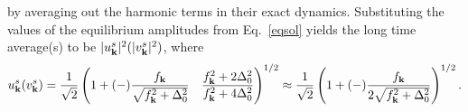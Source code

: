 \documentclass[aps,pra,floats,epsfig,pdflatex]{revtex4}                                                              %
\begin{document}
 {by averaging out the harmonic terms in their exact dynamics.} 
 {Substituting the values of the equilibrium amplitudes from Eq.}~\ref{eqsol}  {yields the long time average(s) to be $|u^s_{\bf k}|^2 (|v^s_{\bf k}|^2)$, where}
\begin{equation}
u^s_{\bf k} (v^s_{\bf k})=\frac{1}{\sqrt{2}}\left(1+(-)\frac{f_{\bf k}}{\sqrt{f^2_{\bf k}+\Delta^2_0}}\quad\frac{f^2_{\bf k}+2\Delta^2_0}{f^2_{\bf k}+4\Delta^2_0}\right)^{1/2}\approx \frac{1}{\sqrt{2}}\left(1+(-)\frac{f_{\bf k}}{2\sqrt{f^2_{\bf k}+\Delta^2_0}}\right)^{1/2}.
\end{equation}
\end{document}
